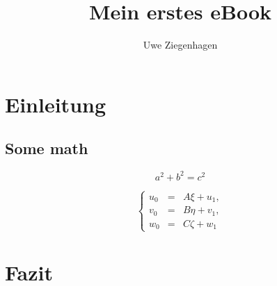 \documentclass[ngerman]{book}
\title{Mein erstes eBook}
\author{Uwe Ziegenhagen}
\begin{document}
\maketitle %
\tableofcontents %
\listoffigures

\chapter{Einleitung}

\blindtext[10]

\section{Some math}

\[a^2+b^2=c^2\]

\begin{equation}
\left\{
\begin{array}{rcl}
u_0 &=& A \xi + u_1, \\
v_0 &=& B \eta + v_1, \\
w_0 &=& C \zeta + w_1 
\end{array}\label{eq3}
\right.
\end{equation}

\chapter{Fazit}


\blindtext[10]
\end{document}

